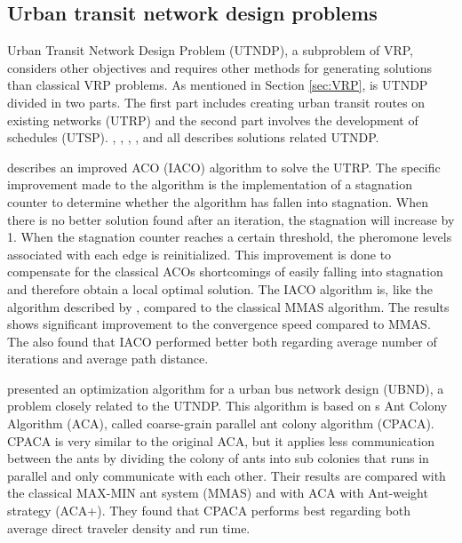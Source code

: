 \subsection{Urban transit network design problems}
\label{subsec:relatedWorkUTNDP}

Urban Transit Network Design Problem (UTNDP), a subproblem of VRP, considers other objectives and requires other methods for generating solutions than classical VRP problems. As mentioned in Section \vref{sec:VRP}, is UTNDP divided in two parts. The first part includes creating urban transit routes on existing networks (UTRP) and the second part involves the development of schedules (UTSP). \citet{yang07}, \citet{jiang10}, \citet{poorzahedy11}, \citet{nikolic14}, and \citet{kechagiopoulos14} all describes solutions related UTNDP. %


\citet{jiang10} describes an improved ACO (IACO) algorithm to solve the UTRP. The specific improvement made to the algorithm is the implementation of a stagnation counter to determine whether the algorithm has fallen into stagnation. When there is no better solution found after an iteration, the stagnation will increase by 1. When the stagnation counter reaches a certain threshold, the pheromone levels associated with each edge is reinitialized. This improvement is done to compensate for the classical ACOs shortcomings of easily falling into stagnation and therefore obtain a local optimal solution. The IACO algorithm is, like the algorithm described by \citet{yang07}, compared to the classical MMAS algorithm. The results shows significant improvement to the convergence speed compared to MMAS. The also found that IACO performed better both regarding average number of iterations and average path distance. 

\citet{yang07} presented an optimization algorithm for a urban bus network design (UBND), a problem closely related to the UTNDP. This algorithm is based on \citet{dorigo96}s Ant Colony Algorithm (ACA), called coarse-grain parallel ant colony algorithm (CPACA). CPACA is very similar to the original ACA, but it applies less communication between the ants by dividing the colony of ants into sub colonies that runs in parallel and only communicate with each other. Their results are compared with the classical MAX-MIN ant system (MMAS)\citep{stutzle99} and with ACA with Ant-weight strategy (ACA+). They found that CPACA performs best regarding both average direct traveler density and run time. 

